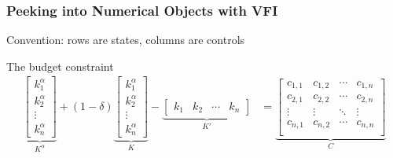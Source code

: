 \documentclass[10pt, aspectratio=1610, handout]{beamer}
\begin{document}
  \begin{frame}
    \frametitle{Peeking into Numerical Objects with VFI}
    \label{apx:numerical_objects}

    Convention: rows are states, columns are controls

    \vfill

    The budget constraint
    \begin{align*}
      \underbrace{\begin{bmatrix}
        k_1^\alpha \\ k_2^\alpha \\ \vdots \\ k_n^\alpha
      \end{bmatrix}}_{K^\alpha}
      + (1 - \delta)
      \underbrace{\begin{bmatrix}
        k_1^\alpha \\ k_2^\alpha \\ \vdots \\ k_n^\alpha
      \end{bmatrix}}_{K}
      -
      \underbrace{\begin{bmatrix}
        k_1 & k_2 & \cdots & k_n
      \end{bmatrix}}_{K'}
      &=
      \underbrace{\begin{bmatrix}
        c_{1,1} & c_{1,2} & \cdots & c_{1,n} \\
        c_{2,1} & c_{2,2} & \cdots & c_{2,n} \\
        \vdots  & \vdots  & \ddots & \vdots  \\
        c_{n,1} & c_{n,2} & \cdots & c_{n,n} \\
      \end{bmatrix}}_{C}
    \end{align*}

    \vfill


\end{frame}
\end{document}
